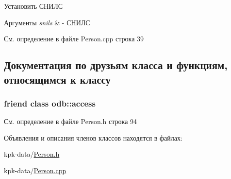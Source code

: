 Установить СНИЛС 


\begin{DoxyParams}{Аргументы}
{\em snils} & -\/ СНИЛС \\
\hline
\end{DoxyParams}


См. определение в файле Person.\+cpp строка 39



\subsection{Документация по друзьям класса и функциям, относящимся к классу}
\subsubsection[{\texorpdfstring{odb\+::access}{odb::access}}]{\setlength{\rightskip}{0pt plus 5cm}friend class odb\+::access\hspace{0.3cm}{\ttfamily [friend]}}\hypertarget{classkpk_1_1data_1_1_person_acb4d953abf85ae525f1d06a0c3a86a55}{}\label{classkpk_1_1data_1_1_person_acb4d953abf85ae525f1d06a0c3a86a55}


См. определение в файле Person.\+h строка 94



Объявления и описания членов классов находятся в файлах\+:\begin{DoxyCompactItemize}
\item 
kpk-\/data/\hyperlink{_person_8h}{Person.\+h}\item 
kpk-\/data/\hyperlink{_person_8cpp}{Person.\+cpp}\end{DoxyCompactItemize}

